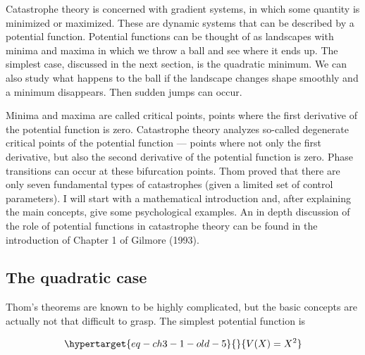 \documentclass[
  a4paper,
  DIV=11,
  numbers=noendperiod,
  oneside]{scrreprt}
\begin{document}
Catastrophe theory is concerned with gradient systems, in which some
quantity is minimized or maximized. These are dynamic systems that can
be described by a potential function. Potential functions can be thought
of as landscapes with minima and maxima in which we throw a ball and see
where it ends up. The simplest case, discussed in the next section, is
the quadratic minimum. We can also study what happens to the ball if the
landscape changes shape smoothly and a minimum disappears. Then sudden
jumps can occur.

Minima and maxima are called critical points, points where the first
derivative of the potential function is zero. Catastrophe theory
analyzes so-called degenerate critical points of the potential function
--- points where not only the first derivative, but also the second
derivative of the potential function is zero. Phase transitions can
occur at these bifurcation points. Thom proved that there are only seven
fundamental types of catastrophes (given a limited set of control
parameters). I will start with a mathematical introduction and, after
explaining the main concepts, give some psychological examples. An in
depth discussion of the role of potential functions in catastrophe
theory can be found in the introduction of Chapter 1 of Gilmore (1993).

\hypertarget{sec-The-quadratic-case}{%
\subsection{The quadratic case}\label{sec-The-quadratic-case}}

Thom's theorems are known to be highly complicated, but the basic
concepts are actually not that difficult to grasp. The simplest
potential function is

\begin{equation}\protect\hypertarget{eq-ch3-1-old-5}{}{
V(X) = X^{2}
}\label{eq-ch3-1-old-5}\end{equation}
\end{document}
